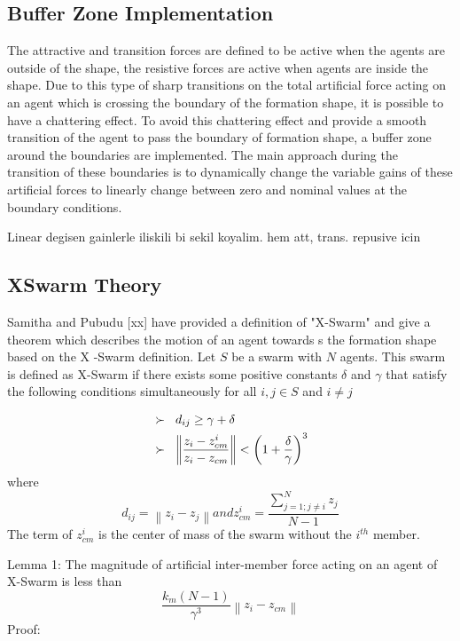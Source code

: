 \documentclass[twoside]{article}
\newcommand{\norm}[1]{\left\lVert#1\right\rVert}
\begin{document}
\begin{multicols}{2}
			
			\subsection{Buffer Zone Implementation}
			
     The attractive and transition forces are defined to be active when the agents are outside of the shape, the resistive forces are active when agents are inside the shape. Due to this type of sharp transitions on the total artificial force acting on an agent which is crossing the boundary of the formation shape, it is possible to have a chattering effect. To avoid this chattering effect and provide a smooth transition of the agent to pass the boundary of formation shape, a buffer zone around the boundaries are implemented. The main approach during the transition of these boundaries is to dynamically change the variable gains of these artificial forces to linearly change between zero and nominal values at the boundary conditions. 
     
     Linear degisen gainlerle iliskili bi sekil koyalim. hem att, trans. repusive icin
			
			\subsection{XSwarm Theory}
			
			Samitha and Pubudu [xx] have provided a definition of "X-Swarm" and give a theorem which describes the motion of an agent towards s the formation shape based on the X -Swarm definition. Let $S$ be a swarm with $N$ agents. This swarm is defined as X-Swarm if there exists some positive constants $\delta$ and  $ \gamma$ that satisfy the following conditions simultaneously for all $i,j \in S$ and $i \neq j$
			
\begin{align*}
&\succ\hspace{0.2cm}  d_{ij} \geq \gamma + \delta \\
&\succ \hspace{0.2cm}   \norm{\frac{z_i - z_{cm}^i}{z_i - z_{cm}}} < \left(1+\frac{\delta}{\gamma}\right)^3
\end{align*}
			where
\begin{equation}
 d_{ij} = \norm{z_i - z_j} and z_{cm}^i = \frac{\sum_{j=1; j\neq i}^{N} z_j}{N-1}
\end{equation}
The term of $z_{cm}^i$ is the center of mass of the swarm without the $i^{th}$ member.

Lemma 1: The magnitude of artificial inter-member force acting on an agent of X-Swarm  is less than
\begin{equation}
 \frac{k_m(N-1)}{\gamma ^3} \norm{z_i - z_{cm}}
\end{equation}
Proof:


\end{multicols}
\end{document}
